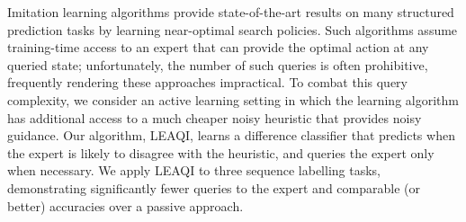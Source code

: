 Imitation learning algorithms provide state-of-the-art results on many structured prediction tasks by learning near-optimal search policies. Such algorithms assume training-time access to an expert that can provide the optimal action at any queried state; unfortunately, the number of such queries is often prohibitive, frequently rendering these approaches impractical. To combat this query complexity, we consider an active learning setting in which the learning algorithm has additional access to a much cheaper noisy heuristic that provides noisy guidance. Our algorithm, LEAQI, learns a difference classifier that predicts when the expert is likely to disagree with the heuristic, and queries the expert only when necessary. We apply LEAQI to three sequence labelling tasks, demonstrating significantly fewer queries to the expert and comparable (or better) accuracies over a passive approach.
